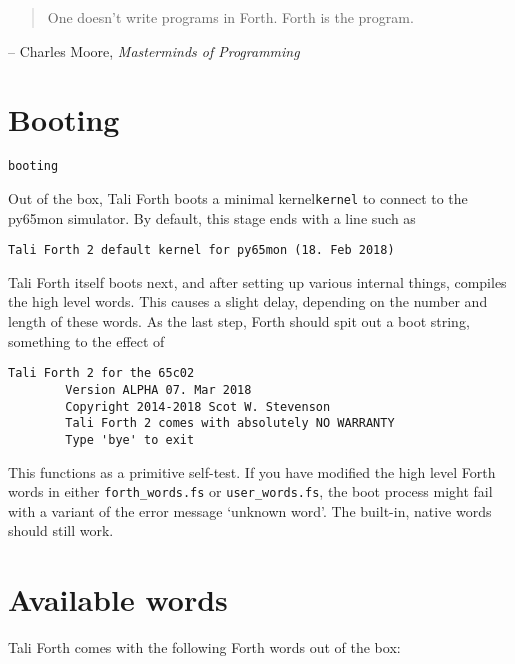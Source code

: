
\begin{quote}
	One doesn't write programs in Forth. Forth is the program.
\end{quote}
\begin{flushright}
        -- Charles Moore, \textit{Masterminds of Programming}\cite{biancuzzi09}
\end{flushright}


\section{Booting}\texttt{booting}

Out of the box, Tali Forth boots a minimal kernel\texttt{kernel}
to connect to the py65mon simulator. By default, this stage ends
with a line such as

\begin{lstlisting}[frame=lines]
        Tali Forth 2 default kernel for py65mon (18. Feb 2018)
\end{lstlisting}

\noindent Tali Forth itself boots next, and after setting up various internal
things, compiles the high level words. This causes a slight delay, depending on
the number and length of these words. As the last step, Forth should spit out a
boot string, something to the effect of

\begin{lstlisting}[frame=lines]
        Tali Forth 2 for the 65c02
        Version ALPHA 07. Mar 2018 
        Copyright 2014-2018 Scot W. Stevenson
        Tali Forth 2 comes with absolutely NO WARRANTY
        Type 'bye' to exit
\end{lstlisting}

\noindent This functions as a primitive self-test. If you have modified the high
level Forth words in either \texttt{forth\_words.fs} or
\texttt{user\_words.fs}, the boot process might fail with a variant of the error
message `unknown word'. The built-in, native words should still work.


\section{Available words}

Tali Forth comes with the following Forth words out of the
box:

